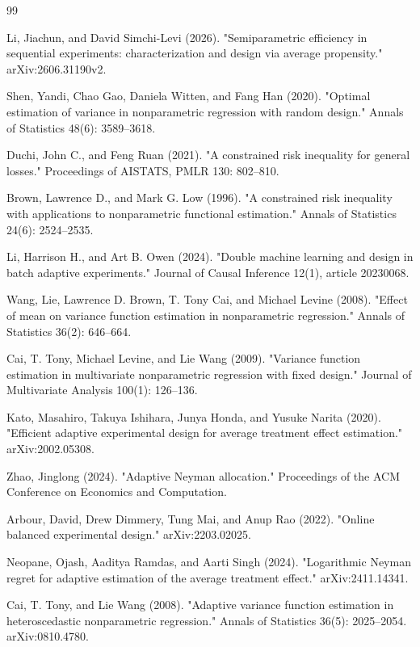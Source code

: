\documentclass{article}
\begin{document}
\begin{thebibliography}{99}

   Li, Jiachun, and David Simchi-Levi (2026). "Semiparametric efficiency in sequential experiments: characterization and design via average propensity." arXiv:2606.31190v2.

   Shen, Yandi, Chao Gao, Daniela Witten, and Fang Han (2020). "Optimal estimation of variance in nonparametric regression with random design." Annals of Statistics 48(6): 3589--3618.

   Duchi, John C., and Feng Ruan (2021). "A constrained risk inequality for general losses." Proceedings of AISTATS, PMLR 130: 802--810.

   Brown, Lawrence D., and Mark G. Low (1996). "A constrained risk inequality with applications to nonparametric functional estimation." Annals of Statistics 24(6): 2524--2535.

   Li, Harrison H., and Art B. Owen (2024). "Double machine learning and design in batch adaptive experiments." Journal of Causal Inference 12(1), article 20230068.

   Wang, Lie, Lawrence D. Brown, T. Tony Cai, and Michael Levine (2008). "Effect of mean on variance function estimation in nonparametric regression." Annals of Statistics 36(2): 646--664.

   Cai, T. Tony, Michael Levine, and Lie Wang (2009). "Variance function estimation in multivariate nonparametric regression with fixed design." Journal of Multivariate Analysis 100(1): 126--136.

   Kato, Masahiro, Takuya Ishihara, Junya Honda, and Yusuke Narita (2020). "Efficient adaptive experimental design for average treatment effect estimation." arXiv:2002.05308.

   Zhao, Jinglong (2024). "Adaptive Neyman allocation." Proceedings of the ACM Conference on Economics and Computation.

   Arbour, David, Drew Dimmery, Tung Mai, and Anup Rao (2022). "Online balanced experimental design." arXiv:2203.02025.

   Neopane, Ojash, Aaditya Ramdas, and Aarti Singh (2024). "Logarithmic Neyman regret for adaptive estimation of the average treatment effect." arXiv:2411.14341.

   Cai, T. Tony, and Lie Wang (2008). "Adaptive variance function estimation in heteroscedastic nonparametric regression." Annals of Statistics 36(5): 2025--2054. arXiv:0810.4780.

\end{thebibliography}
\end{document}
